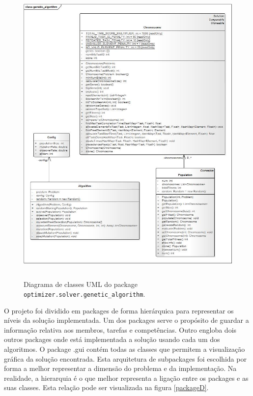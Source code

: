 \begin{titlepage}
\begin{figure}[H]
  \centering
    \includegraphics[width=13.5cm, height = 15.5cm]{uml.jpg}
  \caption{Diagrama de classes UML do package \texttt{optimizer.solver.genetic\_algorithm}.}
  \label{uml}
\end{figure}

O projeto foi dividido em packages de forma hierárquica para representar os níveis da solução implementada. Um dos packages serve o propósito de guardar a informação relativa aos membros, tarefas e competências. Outro engloba dois outros packages onde está implementada a solução usando cada um dos algoritmos. O package .gui contém todas as classes que permitem a visualização gráfica da solução encontrada. Esta arquitetura de subpackages foi escolhida por forma a melhor representar a dimensão do problema e da implementação. Na realidade, a hierarquia é o que melhor representa a ligação entre os packages e as suas classes. Esta relação pode ser visualizada na figura \ref{packageD}.


\end{titlepage}
